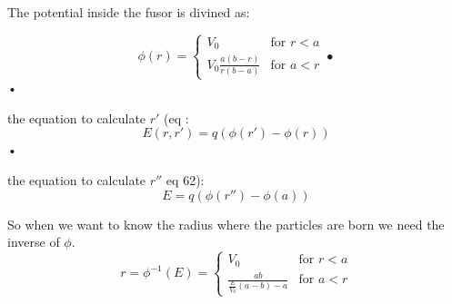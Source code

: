 \documentclass[a3]{book}
\begin{document}
The potential inside the fusor is divined as: 

\begin{equation}
 \phi(r) = 
 	\begin{cases}
		V_0 & \text{for } r < a \\
		V_0 \frac{a ( b - r ) }{r ( b - a )} & \text{for } a < r
	\end{cases}•
\end{equation}•

the equation to calculate $r'$ (eq :
\begin{equation}
 E(r, r') = q ( \phi(r') - \phi(r) ) 
\end{equation}•

the equation to calculate $r''$ eq 62):
\begin{equation}
 E = q ( \phi(r'') - \phi(a) ) 
\end{equation}

So when we want to know the radius where the particles are born we need the inverse of $\phi$. 
\begin{equation}
 r = \phi^{-1}(E) = 
 	\begin{cases}
		V_0 & \text{for } r < a \\
		\frac{ab}{\frac{E}{V_0} ( a - b ) - a} & \text{for } a < r
	\end{cases}
\end{equation}



\newpage
\end{document}
